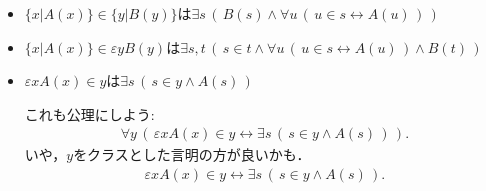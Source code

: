\documentclass[a4j,10.5pt,oneside,openany]{jsbook}
\theoremstyle{mystyle}
\begin{document}
\begin{itemize}
\begin{align}
				\forall u\, \left(\, u \in s \leftrightarrow A(u)\, \right)\, \right)
			\end{align}
			が成り立っているとして，
			\begin{align}
				\sigma = \varepsilon s\, \left(\, s \in \eta \wedge 
				\forall u\, \left(\, u \in s \leftrightarrow A(u)\, \right)\, \right)
			\end{align}
			としよう．すると
			\begin{align}
				\sigma \in \eta \wedge 
				\forall u\, \left(\, u \in \sigma \leftrightarrow A(u)\, \right)
			\end{align}
			が成り立つので
			\begin{align}
				\sigma \in \eta
			\end{align}
			かつ
			\begin{align}
				\sigma = \{x|A(x)\}
			\end{align}
			が成立する．ゆえに
			\begin{align}
				\{x|A(x)\} \in \eta
			\end{align}
			が成立する．以上で
			\begin{align}
				\{x|A(x)\} \in \eta \leftrightarrow
				\exists s\, \left(\, s \in \eta \wedge 
				\forall u\, \left(\, u \in s \leftrightarrow A(u)\, \right)\, \right)
			\end{align}
			が得られた．
			
		\item $\{x|A(x)\} \in \{y|B(y)\}$は$\exists s\, \left(\, B(s) \wedge 
			\forall u\, \left(\, u \in s \leftrightarrow A(u)\, \right)\, \right)$
		
		\item $\{x|A(x)\} \in \varepsilon y B(y)$は$\exists s,t\, \left(\, s \in t \wedge 
			\forall u\, \left(\, u \in s \leftrightarrow A(u)\, \right) \wedge B(t)\, \right)$
		
		\item $\varepsilon x A(x) \in y$は$\exists s\, \left(\, s \in y \wedge A(s)\, \right)$
			
			これも公理にしよう:
			\begin{align}
				\forall y\, \left(\, \varepsilon x A(x) \in y \leftrightarrow
				\exists s\, \left(\, s \in y \wedge A(s)\, \right)\, \right).
			\end{align}
			いや，$y$をクラスとした言明の方が良いかも．
			\begin{align}
				\varepsilon x A(x) \in y \leftrightarrow
				\exists s\, \left(\, s \in y \wedge A(s)\, \right).
			\end{align}
		

\end{itemize}
\end{document}
